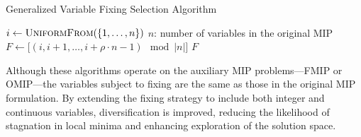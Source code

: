 \begin{algorithm}[H]
\caption{Generalized Variable Fixing Selection Algorithm}\label{alg:gen_variable_fixing}
\begin{algorithmic}[1]
    \State $i \gets \Call{UniformFrom}{\{1,\dots,n\}}$ \Comment $n$: number of variables in the original MIP 
    \State $F \gets \big[(i,i+1,\dots,i+\rho\cdot n -1) \mod |n|\big]$
    \State \Return $F$
\EndFunction
\end{algorithmic}
\end{algorithm}
Although these algorithms operate on the auxiliary MIP problems---FMIP or OMIP---the variables subject to fixing are the same as those in the original MIP formulation. By extending the fixing strategy to include both integer and continuous variables, diversification is improved, reducing the likelihood of stagnation in local minima and enhancing exploration of the solution space.
